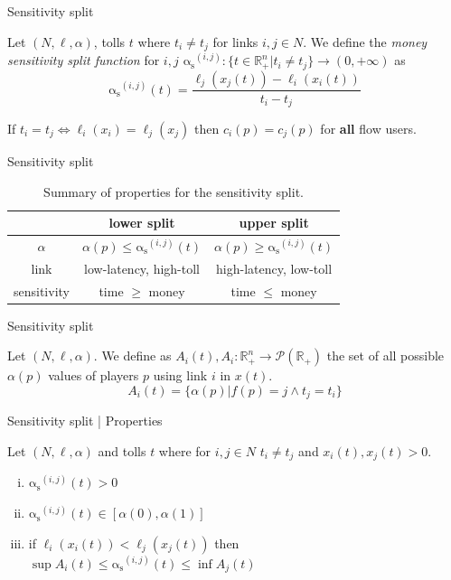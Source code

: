 \documentclass[handout]{beamer}
\newcommand{\as}{\mathrm{\alpha_s}}
\newcommand{\R}{\mathbb{R}}
\begin{document}
\begin{frame}{Sensitivity split}
	\begin{definition}
		Let $(N, \ell, \alpha)$, tolls $t$ where $t_i \ne t_j$ for links $i, j \in N$.
		We define the \textit{money sensitivity split function} for $i, j$ $\as^{(i, j)}: \{t \in \R_+^n|t_i \ne t_j\} \rightarrow (0, +\infty)$ as
		\[\as^{(i, j)}(t) = \frac{\ell_j(x_j(t)) - \ell_i(x_i(t))}{t_i - t_j}\]
	\end{definition}
	If $t_i = t_j \Leftrightarrow \ell_i(x_i) = \ell_j(x_j)$ then $c_i(p) = c_j(p)$ for \textbf{all} flow users.
\end{frame}

\begin{frame}{Sensitivity split}
	\begin{table}[h!]
		\centering
		\caption{Summary of properties for the sensitivity split.}
		\begin{tabular}{| c || c | c |}
			\hline
			& \textbf{lower split} & \textbf{upper split} \\ \hline
			$\alpha$ & $\alpha(p) \le \as^{(i, j)}(t)$ & $\alpha(p) \ge \as^{(i, j)}(t)$ \\ \hline
			link & low-latency, high-toll & high-latency, low-toll \\ \hline
			sensitivity & time $\ge$ money & time $\le$ money \\ \hline
		\end{tabular}
		\label{table:split_summary}
	\end{table}
\end{frame}

\begin{frame}{Sensitivity split}
	\begin{definition}
		Let $(N, \ell, \alpha)$.
		We define as $A_i(t), A_i: \R_+^n \rightarrow \mathcal{P}(\R_+)$ the set of all possible $\alpha(p)$ values of players $p$ using link $i$ in $x(t)$.
		\[A_i(t) = \{\alpha(p) | f(p) = j \wedge t_j = t_i\}\]
	\end{definition}
\end{frame}

\begin{frame}{Sensitivity split | Properties}
	\begin{lemma}
		Let $(N, \ell, \alpha)$ and tolls $t$ where for $i, j \in N$ $t_i \ne t_j$ and $x_i(t), x_j(t) > 0$.
		\begin{enumerate}[(i)]
			\item $\as^{(i, j)}(t) > 0$
			\item $\as^{(i, j)}(t) \in [\alpha(0), \alpha(1)]$
			\item if $\ell_i(x_i(t)) < \ell_j(x_j(t))$ then
			$\sup A_i(t) \le \as^{(i, j)}(t) \le \inf A_j(t)$
		\end{enumerate}
	\end{lemma}
\end{frame}
\end{document}
